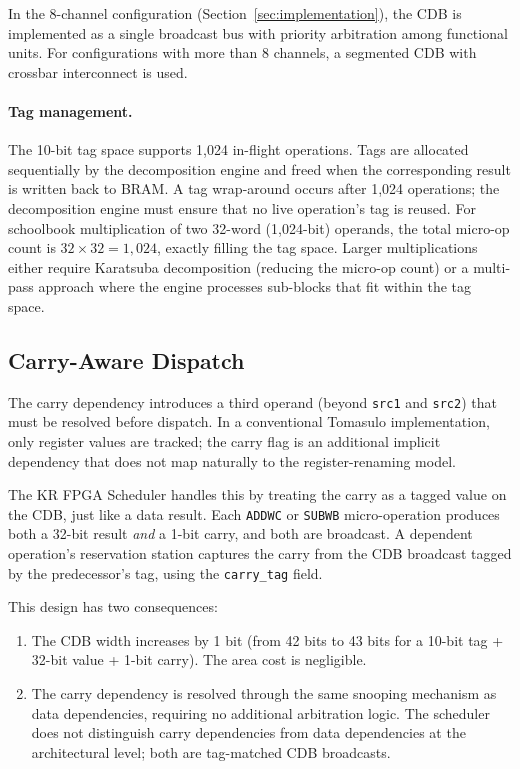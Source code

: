 \documentclass[11pt,a4paper]{article}
\begin{document}
In the 8-channel configuration (Section~\ref{sec:implementation}), the CDB
is implemented as a single broadcast bus with priority arbitration among
functional units.  For configurations with more than 8 channels, a
segmented CDB with crossbar interconnect is used.

\paragraph{Tag management.}
The 10-bit tag space supports 1,024 in-flight operations.  Tags are allocated
sequentially by the decomposition engine and freed when the corresponding
result is written back to BRAM.  A tag wrap-around occurs after 1,024
operations; the decomposition engine must ensure that no live operation's tag
is reused.  For schoolbook multiplication of two 32-word (1,024-bit)
operands, the total micro-op count is $32 \times 32 = 1{,}024$, exactly
filling the tag space.  Larger multiplications either require Karatsuba
decomposition (reducing the micro-op count) or a multi-pass approach where
the engine processes sub-blocks that fit within the tag space.

\subsection{Carry-Aware Dispatch}
\label{sec:carry-dispatch}

The carry dependency introduces a third operand (beyond \texttt{src1} and
\texttt{src2}) that must be resolved before dispatch.  In a conventional
Tomasulo implementation, only register values are tracked; the carry flag is
an additional implicit dependency that does not map naturally to the
register-renaming model.

The KR FPGA Scheduler handles this by treating the carry as a tagged value on
the CDB, just like a data result.  Each \texttt{ADDWC} or \texttt{SUBWB}
micro-operation produces both a 32-bit result \emph{and} a 1-bit carry, and
both are broadcast.  A dependent operation's reservation station captures
the carry from the CDB broadcast tagged by the predecessor's tag, using the
\texttt{carry\_tag} field.

This design has two consequences:

\begin{enumerate}[leftmargin=*]
  \item The CDB width increases by 1 bit (from 42 bits to 43 bits for a
    10-bit tag + 32-bit value + 1-bit carry).  The area cost is negligible.

  \item The carry dependency is resolved through the same snooping mechanism
    as data dependencies, requiring no additional arbitration logic.  The
    scheduler does not distinguish carry dependencies from data
    dependencies at the architectural level; both are tag-matched CDB
    broadcasts.
\end{enumerate}
\end{document}
